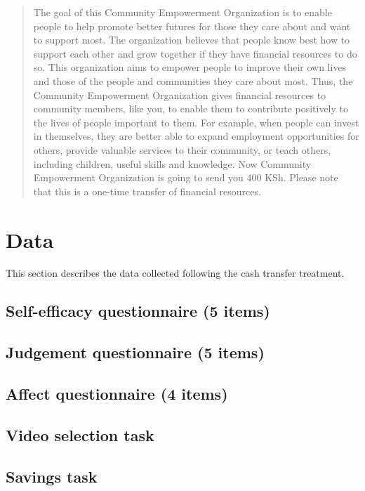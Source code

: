 \documentclass[11pt, a4paper]{article}\usepackage[]{graphicx}\usepackage[]{color}
\begin{document}
            \begin{quote}

                The goal of this Community Empowerment Organization is to enable people to help promote better futures for those they care about and want to support most. The organization believes that people know best how to support each other and grow together if they have financial resources to do so. This organization aims to empower people to improve their own lives and those of the people and communities they care about most. Thus, the Community Empowerment Organization gives financial resources to community members, like you, to enable them to contribute positively to the lives of people important to them. For example, when people can invest in themselves, they are better able to expand employment opportunities for others, provide valuable services to their community, or teach others, including children, useful skills and knowledge. Now Community Empowerment Organization is going to send you 400 KSh. Please note that this is a one-time transfer of financial resources.

            \end{quote}

\section{Data}

    This section describes the data collected following the cash transfer treatment.

    \subsection{Self-efficacy questionnaire (5 items)}
    \subsection{Judgement questionnaire (5 items)}
    \subsection{Affect questionnaire (4 items)}
    \subsection{Video selection task}
    \subsection{Savings task}
\end{document}
